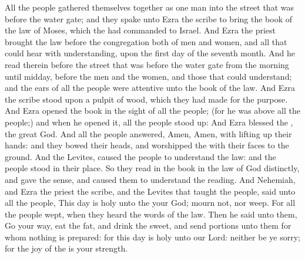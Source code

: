  All the people gathered themselves together as one man into the street that was before the water gate; and they spake unto Ezra the scribe to bring the book of the law of Moses, which the  had commanded to Israel. And Ezra the priest brought the law before the congregation both of men and women, and all that could hear with understanding, upon the first day of the seventh month. And he read therein before the street that was before the water gate from the morning until midday, before the men and the women, and those that could understand; and the ears of all the people were attentive unto the book of the law. And Ezra the scribe stood upon a pulpit of wood, which they had made for the purpose. And Ezra opened the book in the sight of all the people; (for he was above all the people;) and when he opened it, all the people stood up: And Ezra blessed the , the great God. And all the people answered, Amen, Amen, with lifting up their hands: and they bowed their heads, and worshipped the  with their faces to the ground. And the Levites, caused the people to understand the law: and the people stood in their place. So they read in the book in the law of God distinctly, and gave the sense, and caused them to understand the reading. And Nehemiah, and Ezra the priest the scribe, and the Levites that taught the people, said unto all the people, This day is holy unto the  your God; mourn not, nor weep. For all the people wept, when they heard the words of the law. Then he said unto them, Go your way, eat the fat, and drink the sweet, and send portions unto them for whom nothing is prepared: for this day is holy unto our Lord: neither be ye sorry; for the joy of the  is your strength.

